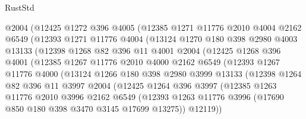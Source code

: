 \begin{lexlean}{RustStd}
\begin{coremodule}
              @2004
              (@12425
                @1272
                @396
                @4005
                (@12385
                  @1271
                  @11776
                  @2010
                  @4004
                  @2162
                  @6549
                  (@12393
                    @1271
                    @11776
                    @4004
                    (@13124
                      @1270
                      @180
                      @398
                      @2980
                      @4003
                      @13133
                      (@12398
                        @1268
                        @82
                        @396
                        @11
                        @4001
                        @2004
                        (@12425
                          @1268
                          @396
                          @4001
                          (@12385
                            @1267
                            @11776
                            @2010
                            @4000
                            @2162
                            @6549
                            (@12393
                              @1267
                              @11776
                              @4000
                              (@13124
                                @1266
                                @180
                                @398
                                @2980
                                @3999
                                @13133
                                (@12398
                                  @1264
                                  @82
                                  @396
                                  @11
                                  @3997
                                  @2004
                                  (@12425
                                    @1264
                                    @396
                                    @3997
                                    (@12385
                                      @1263
                                      @11776
                                      @2010
                                      @3996
                                      @2162
                                      @6549
                                      (@12393
                                        @1263
                                        @11776
                                        @3996
                                        (@17690 @850 @180 @398 @3470 @3145 @17699 @13275))
                                      @12119))

\end{coremodule}
\end{lexlean}
